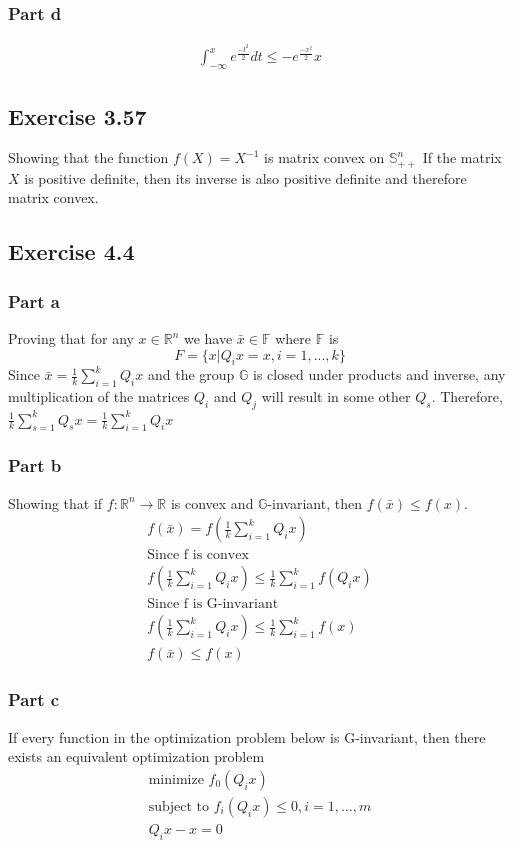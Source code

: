 \subsubsection{Part d}
\begin{gather}
  \int_{-\infty}^{x} e^\frac{-t^2}{2}dt \leq -e^\frac{-x^2}{2}x 
\end{gather}

\subsection{Exercise 3.57}
Showing that the function $f(X) = X^{-1} $ is matrix convex on $\mathbb{S}_{++}^n$
If the matrix $X$ is positive definite, then its inverse is also positive definite and therefore matrix convex.
\subsection{Exercise 4.4}
\subsubsection{Part a}
Proving that for any $x \in \mathbb{R}^n$ we have $\bar{x} \in \mathbb{F}$ where $\mathbb{F}$ is 
\begin{equation}
  F = \{ x | Q_i x = x, i = 1, ... , k \}
\end{equation}
Since $\bar{x} = \frac{1}{k} \sum_{i=1}^{k} Q_i x$ and the group $\mathbb{G}$ is closed under products and inverse, any multiplication of the matrices $Q_i$ and $Q_j$ will result in some other $Q_s$. Therefore, $\frac{1}{k} \sum_{s=1}^{k} Q_s x = \frac{1}{k} \sum_{i=1}^{k} Q_i x$
\subsubsection{Part b}
Showing that if $f : \mathbb{R}^n \to \mathbb{R}$ is convex and $\mathbb{G}$-invariant, then $f(\bar{x}) \leq f(x)$.
\begin{gather}
  f(\bar{x}) = f(\frac{1}{k} \sum_{i=1}^{k} Q_i x) \\
  \text{Since f is convex} \\
  f(\frac{1}{k} \sum_{i=1}^{k} Q_i x) \leq \frac{1}{k} \sum_{i=1}^{k} f(Q_i x) \\
  \text{Since f is G-invariant} \\
  f(\frac{1}{k} \sum_{i=1}^{k} Q_i x) \leq \frac{1}{k} \sum_{i=1}^{k} f(x) \\
  f(\bar{x}) \leq f(x)
\end{gather}
\subsubsection{Part c}
If every function in the optimization problem below is G-invariant, then there exists an equivalent optimization problem
\begin{equation}
  \begin{aligned}
    \text{minimize } f_0 (Q_i x) \\
    \text{subject to } f_i(Q_i x) \leq 0, i = 1, \dots, m \\
    Q_i x - x = 0
  \end{aligned}
\end{equation}


